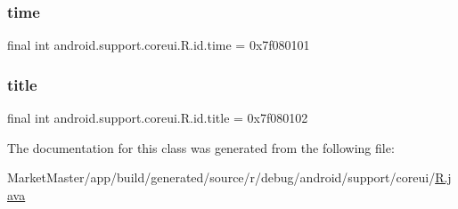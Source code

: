 \subsubsection{\texorpdfstring{time}{time}}
{\footnotesize\ttfamily final int android.\+support.\+coreui.\+R.\+id.\+time = 0x7f080101\hspace{0.3cm}{\ttfamily [static]}}

\mbox{\label{classandroid_1_1support_1_1coreui_1_1R_1_1id_acd9ab7fdae28f0ae11ffbf38849039fa}} 
\subsubsection{\texorpdfstring{title}{title}}
{\footnotesize\ttfamily final int android.\+support.\+coreui.\+R.\+id.\+title = 0x7f080102\hspace{0.3cm}{\ttfamily [static]}}



The documentation for this class was generated from the following file\+:\begin{DoxyCompactItemize}
\item 
Market\+Master/app/build/generated/source/r/debug/android/support/coreui/\mbox{\hyperlink{debug_2android_2support_2coreui_2R_8java}{R.\+java}}\end{DoxyCompactItemize}
